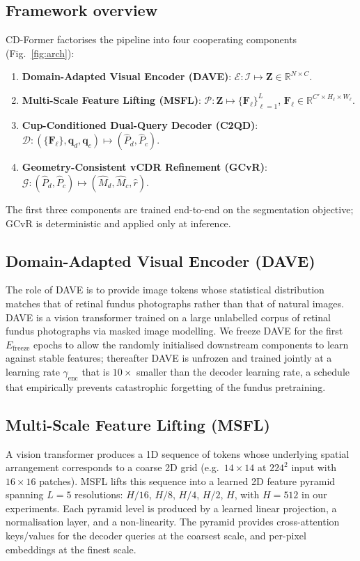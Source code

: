\documentclass[runningheads]{llncs}
\begin{document}
\subsection{Framework overview}
CD-Former factorises the pipeline into four cooperating components (Fig.~\ref{fig:arch}):
\begin{enumerate}
  \item \textbf{Domain-Adapted Visual Encoder (DAVE)}: $\mathcal{E}: \mathcal{I} \mapsto \mathbf{Z} \in \mathbb{R}^{N \times C}$.
  \item \textbf{Multi-Scale Feature Lifting (MSFL)}: $\mathcal{P}: \mathbf{Z} \mapsto \{\mathbf{F}_\ell\}_{\ell=1}^{L}$, $\mathbf{F}_\ell \in \mathbb{R}^{C' \times H_\ell \times W_\ell}$.
  \item \textbf{Cup-Conditioned Dual-Query Decoder (C2QD)}: $\mathcal{D}: (\{\mathbf{F}_\ell\}, \mathbf{q}_d, \mathbf{q}_c) \mapsto (\hat{P}_d, \hat{P}_c)$.
  \item \textbf{Geometry-Consistent vCDR Refinement (GCvR)}: $\mathcal{G}: (\hat{P}_d, \hat{P}_c) \mapsto (\hat{M}_d, \hat{M}_c, \hat{r})$.
\end{enumerate}
The first three components are trained end-to-end on the segmentation objective; GCvR is deterministic and applied only at inference.

\subsection{Domain-Adapted Visual Encoder (DAVE)}
The role of DAVE is to provide image tokens whose statistical distribution matches that of retinal fundus photographs rather than that of natural images. DAVE is a vision transformer trained on a large unlabelled corpus of retinal fundus photographs via masked image modelling. We freeze DAVE for the first $E_\text{freeze}$ epochs to allow the randomly initialised downstream components to learn against stable features; thereafter DAVE is unfrozen and trained jointly at a learning rate $\gamma_\text{enc}$ that is $10\times$ smaller than the decoder learning rate, a schedule that empirically prevents catastrophic forgetting of the fundus pretraining.

\subsection{Multi-Scale Feature Lifting (MSFL)}
A vision transformer produces a 1D sequence of tokens whose underlying spatial arrangement corresponds to a coarse 2D grid (e.g.~$14\!\times\!14$ at $224^2$ input with $16\!\times\!16$ patches). MSFL lifts this sequence into a learned 2D feature pyramid spanning $L=5$ resolutions: $H/16$, $H/8$, $H/4$, $H/2$, $H$, with $H=512$ in our experiments. Each pyramid level is produced by a learned linear projection, a normalisation layer, and a non-linearity. The pyramid provides cross-attention keys/values for the decoder queries at the coarsest scale, and per-pixel embeddings at the finest scale.
\end{document}
